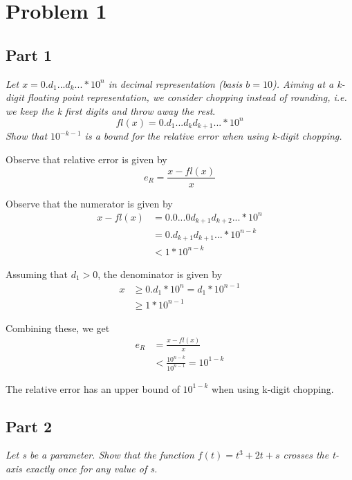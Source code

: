 \section{Problem 1}

\subsection{Part 1}
\textit{Let $x = 0.d_1...d_k... * 10^n$ in decimal representation (basis $b = 10$). Aiming at a k-digit floating point representation, we consider chopping instead of rounding, i.e. we keep the k first digits and throw away the rest}.
\begin{equation*}
    fl(x) = 0.d_1...d_kd_{k+1}... * 10^n
\end{equation*}
\textit{Show that $10^{-k-1}$ is a bound for the relative error when using k-digit chopping.}


Observe that relative error is given by
\begin{equation}
    e_R = \frac{x - fl(x)}{x}
    \label{eq:relative_error}
\end{equation}

Observe that the numerator is given by
\begin{align*}
    x - fl(x) &= 0.0...0d_{k+1}d_{k+2}... * 10^n \\
    &= 0.d_{k+1}d_{k+1}... * 10^{n - k} \\
    &< 1 * 10^{n-k}
\end{align*}

Assuming that $d_1 > 0$, the denominator is given by
\begin{align*}
    x &\ge 0.d_1 * 10^n = d_1 * 10^{n-1} \\
    &\ge 1 * 10^{n-1}
\end{align*}

Combining these, we get
\begin{align*}
    e_R &= \frac{x - fl(x)}{x} \\
    &< \frac{10^{n-k}}{10^{n-1}} = 10^{1-k}
\end{align*}

The relative error has an upper bound of $10^{1-k}$ when using k-digit chopping.




\newpage

\subsection{Part 2}
\textit{Let s be a parameter. Show that the function $f(t) = t^3 + 2t + s$ crosses the t-axis exactly once for any value of s.}

